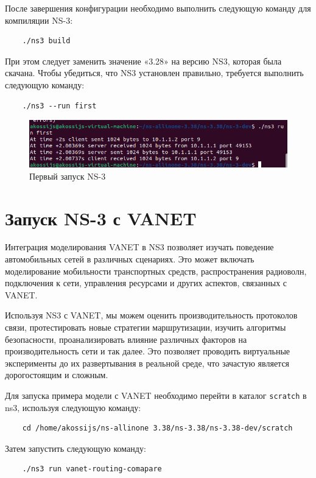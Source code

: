 После завершения конфигурации необходимо выполнить следующую команду для компиляции NS-3:
\begin{verbatim}
    ./ns3 build
\end{verbatim}

При этом следует заменить значение «3.28» на версию NS3, которая была
скачана. Чтобы убедиться, что NS3 установлен правильно, требуется
выполнить следующую команду:

\begin{verbatim}
    ./ns3 --run first
\end{verbatim}

\begin{figure}[!h]
  \centering
  \includegraphics[width=0.9\linewidth]{image/003.PNG}
  \caption{Первый запуск NS-3}
  \label{fig:ns3:1.1}
\end{figure}

\section{Запуск NS-3 с VANET}

Интеграция моделирования VANET в NS3 позволяет изучать поведение
автомобильных сетей в различных сценариях. Это может включать
моделирование мобильности транспортных средств, распространения
радиоволн, подключения к сети, управления ресурсами и других аспектов,
связанных с VANET.

Используя NS3 с VANET, мы можем оценить производительность протоколов
связи, протестировать новые стратегии маршрутизации, изучить алгоритмы
безопасности, проанализировать влияние различных факторов на
производительность сети и так далее. Это позволяет проводить
виртуальные эксперименты до их развертывания в реальной среде, что
зачастую является дорогостоящим и сложным.

Для запуска примера модели с VANET необходимо перейти в каталог
\verb|scratch| в ns3, используя следующую команду:
\begin{verbatim}
    cd /home/akossijs/ns-allinone 3.38/ns-3.38/ns-3.38-dev/scratch
\end{verbatim}
Затем запустить следующую команду:
\begin{verbatim}
    ./ns3 run vanet-routing-comapare
\end{verbatim}

